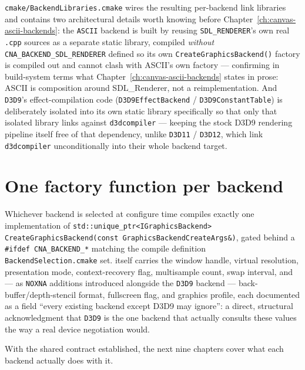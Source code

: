 \texttt{cmake/BackendLibraries.cmake} wires the resulting per-backend link libraries and
contains two architectural details worth knowing before Chapter~\ref{ch:canvas-ascii-backends}:
the \texttt{ASCII} backend is built by reusing \texttt{SDL\_RENDERER}'s own real \texttt{.cpp}
sources as a separate static library, compiled \emph{without} \texttt{CNA\_BACKEND\_SDL\_RENDERER}
defined so its own \texttt{CreateGraphicsBackend()} factory is compiled out and cannot clash
with ASCII's own factory --- confirming in build-system terms what
Chapter~\ref{ch:canvas-ascii-backends} states in prose: ASCII is composition around
SDL\_Renderer, not a reimplementation. And \texttt{D3D9}'s effect-compilation code
(\texttt{D3D9EffectBackend} / \texttt{D3D9ConstantTable}) is deliberately isolated into its own
static library specifically so that only that isolated library links against
\texttt{d3dcompiler} --- keeping the stock D3D9 rendering pipeline itself free of that
dependency, unlike \texttt{D3D11} / \texttt{D3D12}, which link \texttt{d3dcompiler}
unconditionally into their whole backend target.

\section{One factory function per backend}

Whichever backend is selected at configure time compiles exactly one implementation of
\texttt{std::unique\_ptr\allowbreak{}<IGraphicsBackend>\allowbreak{} CreateGraphicsBackend(const
GraphicsBackendCreateArgs\&)}, gated behind a \texttt{\#ifdef CNA\_BACKEND\_*} matching the
compile definition \texttt{BackendSelection.cmake} set. 
itself carries the window handle, virtual resolution, presentation mode, context-recovery
flag, multisample count, swap interval, and --- as \texttt{NOXNA} additions introduced
alongside the \texttt{D3D9} backend --- back-buffer/depth-stencil format, fullscreen flag,
and graphics profile, each documented as a field ``every existing backend except D3D9 may
ignore'': a direct, structural acknowledgment that \texttt{D3D9} is the one backend that
actually consults these values the way a real device negotiation would.

With the shared contract established, the next nine chapters cover what each backend
actually does with it.

